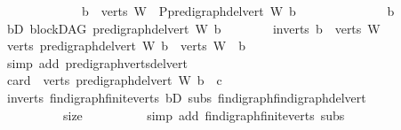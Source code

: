 \begin{isabellebody}
\ \ \ \ \ \ \ \ \ \ \ \ {\isasymLongrightarrow}\ b\ {\isasymin}\ verts\ W\ {\isasymLongrightarrow}\ P{\isacharparenleft}{\kern0pt}pre{\isacharunderscore}{\kern0pt}digraph{\isachardot}{\kern0pt}del{\isacharunderscore}{\kern0pt}vert\ W\ b{\isacharparenright}{\kern0pt}{\isachardoublequoteclose}\isanewline
\ \ \ \ \isamarkupfalse%
\ {\isacharminus}{\kern0pt}\isanewline
\ \ \ \ \ \ \isamarkupfalse%
\ b\isanewline
\ \ \ \ \ \ \isamarkupfalse%
\ bD{}{\isacharcolon}{\kern0pt}\ {\isachardoublequoteopen}blockDAG\ {\isacharparenleft}{\kern0pt}pre{\isacharunderscore}{\kern0pt}digraph{\isachardot}{\kern0pt}del{\isacharunderscore}{\kern0pt}vert\ W\ b{\isacharparenright}{\kern0pt}{\isachardoublequoteclose}\isanewline
\ \ \ \ \ \ \isamarkupfalse%
\ in{\isacharunderscore}{\kern0pt}verts{\isacharcolon}{\kern0pt}\ {\isachardoublequoteopen}b\ {\isasymin}\ verts\ W{\isachardoublequoteclose}\isanewline
\ \ \ \ \ \ \isamarkupfalse%
\ {\isachardoublequoteopen}verts\ {\isacharparenleft}{\kern0pt}pre{\isacharunderscore}{\kern0pt}digraph{\isachardot}{\kern0pt}del{\isacharunderscore}{\kern0pt}vert\ W\ b{\isacharparenright}{\kern0pt}\ {\isacharequal}{\kern0pt}\ verts\ W\ {\isacharminus}{\kern0pt}\ {\isacharbraceleft}{\kern0pt}b{\isacharbraceright}{\kern0pt}{\isachardoublequoteclose}\isanewline
\ \ \ \ \ \ \ \ \isamarkupfalse%
\ {\isacharparenleft}{\kern0pt}simp\ add{\isacharcolon}{\kern0pt}\ pre{\isacharunderscore}{\kern0pt}digraph{\isachardot}{\kern0pt}verts{\isacharunderscore}{\kern0pt}del{\isacharunderscore}{\kern0pt}vert{\isacharparenright}{\kern0pt}\ \isanewline
\ \ \ \ \ \ \isamarkupfalse%
\ \isamarkupfalse%
\ {\isachardoublequoteopen}card\ {\isacharparenleft}{\kern0pt}\ verts\ {\isacharparenleft}{\kern0pt}pre{\isacharunderscore}{\kern0pt}digraph{\isachardot}{\kern0pt}del{\isacharunderscore}{\kern0pt}vert\ W\ b{\isacharparenright}{\kern0pt}{\isacharparenright}{\kern0pt}\ {\isacharequal}{\kern0pt}\ c{\isachardoublequoteclose}\ \isanewline
\ \ \ \ \ \ \ \ \isamarkupfalse%
\ in{\isacharunderscore}{\kern0pt}verts\ fin{\isacharunderscore}{\kern0pt}digraph{\isachardot}{\kern0pt}finite{\isacharunderscore}{\kern0pt}verts\ bD\ subs\ fin{\isacharunderscore}{\kern0pt}digraph{\isachardot}{\kern0pt}fin{\isacharunderscore}{\kern0pt}digraph{\isacharunderscore}{\kern0pt}del{\isacharunderscore}{\kern0pt}vert\ \isanewline
\ \ \ \ \ \ \ \ \ \ size\isanewline
\ \ \ \ \ \ \ \ \isamarkupfalse%
\ {\isacharparenleft}{\kern0pt}simp\ add{\isacharcolon}{\kern0pt}\ fin{\isacharunderscore}{\kern0pt}digraph{\isachardot}{\kern0pt}finite{\isacharunderscore}{\kern0pt}verts\ subs\isanewline

\end{isabellebody}
